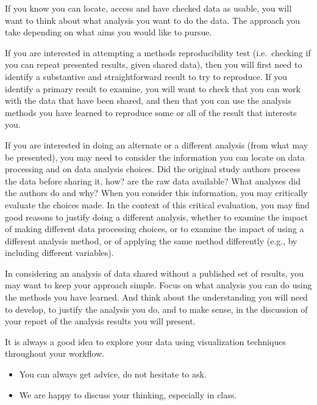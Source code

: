 \documentclass[
  letterpaper,
  DIV=11,
  numbers=noendperiod]{scrreprt}
\providecommand{\tightlist}{%
  \setlength{\itemsep}{0pt}\setlength{\parskip}{0pt}}\usepackage{longtable,booktabs,array}
\begin{document}
If you know you can locate, access and have checked data as usable, you
will want to think about what analysis you want to do the data. The
approach you take depending on what aims you would like to pursue.

If you are interested in attempting a methods reproducibility test
(i.e.~checking if you can repeat presented results, given shared data),
then you will first need to identify a substantive and straightforward
result to try to reproduce. If you identify a primary result to examine,
you will want to check that you can work with the data that have been
shared, and then that you can use the analysis methods you have learned
to reproduce some or all of the result that interests you.

If you are interested in doing an alternate or a different analysis
(from what may be presented), you may need to consider the information
you can locate on data processing and on data analysis choices. Did the
original study authors process the data before sharing it, how? are the
raw data available? What analyses did the authors do and why? When you
consider this information, you may critically evaluate the choices made.
In the context of this critical evaluation, you may find good reasons to
justify doing a different analysis, whether to examine the impact of
making different data processing choices, or to examine the impact of
using a different analysis method, or of applying the same method
differently (e.g., by including different variables).

In considering an analysis of data shared without a published set of
results, you may want to keep your approach simple. Focus on what
analysis you can do using the methods you have learned. And think about
the understanding you will need to develop, to justify the analysis you
do, and to make sense, in the discussion of your report of the analysis
results you will present.

It is always a good idea to explore your data using visualization
techniques throughout your workflow.

\begin{tcolorbox}[enhanced jigsaw, opacitybacktitle=0.6, title=\textcolor{quarto-callout-tip-color}{\faLightbulb}\hspace{0.5em}{Tip}, arc=.35mm, colbacktitle=quarto-callout-tip-color!10!white, colframe=quarto-callout-tip-color-frame, leftrule=.75mm, opacityback=0, breakable, titlerule=0mm, left=2mm, bottomrule=.15mm, toprule=.15mm, colback=white, coltitle=black, bottomtitle=1mm, toptitle=1mm, rightrule=.15mm]

\begin{itemize}
\tightlist
\item
  You can always get advice, do not hesitate to ask.
\item
  We are happy to discuss your thinking, especially in class.
\end{itemize}

\end{tcolorbox}
\end{document}
